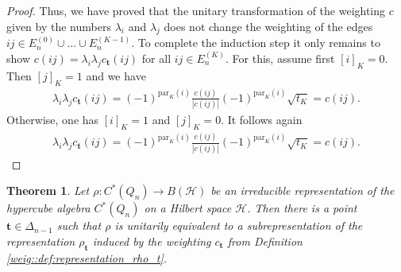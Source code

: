 \documentclass[a4paper]{amsart}
\newtheorem{thm}{Theorem}[section]
\begin{document}
\begin{proof}
    Thus, we have proved that the unitary transformation of the weighting $c$ given by the numbers $\lambda_i$ and $\lambda_j$ does not change the weighting of the edges $ij \in E_n^{(0)} \cup \dots \cup E_n^{(K-1)}$. To complete the induction step it only remains to show $c(ij) = \lambda_i \lambda_j c_\mathbf{t}(ij)$ for all $ij \in E_n^{(K)}$. For this, assume first $[i]_K = 0$. Then $[j]_K = 1$ and we have
    \begin{align*}
        \lambda_i \lambda_j c_\mathbf{t}(ij) = (-1)^{\mathrm{par}_K(i)} \frac{c(ij)}{|c(ij)|}  (-1)^{\mathrm{par}_K(i)} \sqrt{t_K} = c(ij).
    \end{align*}
    Otherwise, one has $[i]_K = 1$ and $[j]_K = 0$. It follows again
    \begin{align*}
        \lambda_i \lambda_j c_\mathbf{t}(ij) = (-1)^{\mathrm{par}_K(i)} \frac{c(ij)}{|c(ij)|}  (-1)^{\mathrm{par}_K(i)} \sqrt{t_K} = c(ij).
    \end{align*}
\end{proof}


\begin{thm}
    \label{irreps::thm:classification_of_irreps}
    Let $\rho: C^\ast(Q_n) \to B(\mathcal{H})$ be an irreducible representation of the hypercube algebra $C^\ast(Q_n)$ on a Hilbert space $\mathcal{H}$. Then there is a point $\mathbf{t} \in \Delta_{n-1}$ such that $\rho$ is unitarily equivalent to a subrepresentation of the representation $\rho_\mathbf{t}$ induced by the weighting $c_\mathbf{t}$ from Definition \ref{weig::def:representation_rho_t}.
\end{thm}
\end{document}
